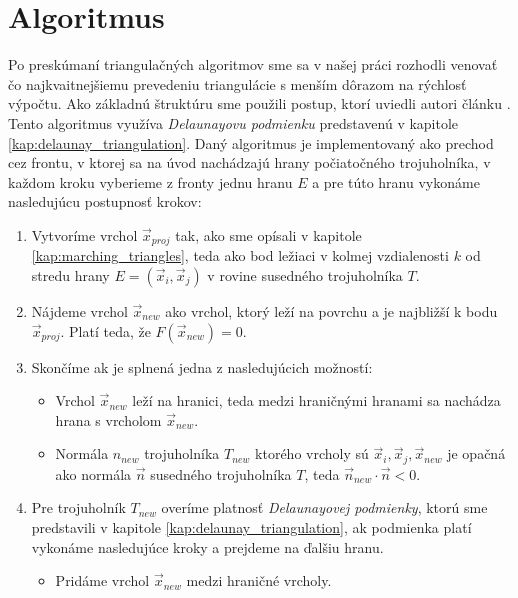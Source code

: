 \chapter{Algoritmus}
\label{kap:algoritmus}
Po preskúmaní triangulačných algoritmov sme sa v našej práci rozhodli venovať čo najkvaitnejšiemu
prevedeniu triangulácie s menším dôrazom na rýchlosť výpočtu. Ako základnú štruktúru sme použili 
postup, ktorí uviedli autori článku \cite{hilton1996marching}. Tento algoritmus využíva 
\textit{Delaunayovu podmienku} predstavenú v kapitole \ref{kap:delaunay_triangulation}.
Daný algoritmus je implementovaný ako prechod cez frontu, v ktorej sa na úvod nachádzajú
hrany počiatočného trojuholníka, v každom kroku vyberieme z fronty jednu hranu $E$ a pre túto
hranu vykonáme nasledujúcu postupnosť krokov:
\begin{enumerate}
    \item{Vytvoríme vrchol $\overrightarrow{x}_{proj}$ tak, ako sme opísali v kapitole \ref{kap:marching_triangles}, teda 
    ako bod ležiaci v kolmej vzdialenosti $k$ od stredu hrany $E = (\overrightarrow{x}_i, \overrightarrow{x}_j)$ 
    v rovine susedného trojuholníka $T$.}
    \item{Nájdeme vrchol $\overrightarrow{x}_{new}$ ako vrchol, ktorý leží na povrchu a je najbližší k bodu 
    $\overrightarrow{x}_{proj}$. 
    Platí teda, že $F(\overrightarrow{x}_{new}) = 0$.}
    \item{Skončíme ak je splnená jedna z nasledujúcich možností:
    \begin{itemize}
        \item{Vrchol $\overrightarrow{x}_{new}$ leží na hranici, teda medzi hraničnými 
        hranami sa nachádza hrana s vrcholom $\overrightarrow{x}_{new}$.}
        \item{Normála $n_{new}$ trojuholníka $T_{new}$ ktorého vrcholy sú $\overrightarrow{x}_i, 
        \overrightarrow{x}_j, \overrightarrow{x}_{new}$ je opačná ako
        normála $\overrightarrow{n}$ susedného trojuholníka $T$, teda 
        $\overrightarrow{n}_{new} \cdot \overrightarrow{n} < 0$.}
    \end{itemize}
    }
    \item{Pre trojuholník $T_{new}$ overíme platnosť \textit{Delaunayovej podmienky}, 
    ktorú sme predstavili v kapitole \ref{kap:delaunay_triangulation}, ak podmienka platí
    vykonáme nasledujúce kroky a prejdeme na ďalšiu hranu.
    \begin{itemize}
        \item{Pridáme vrchol $\overrightarrow{x}_{new}$ medzi hraničné vrcholy.}

\end{itemize}}
\end{enumerate}
